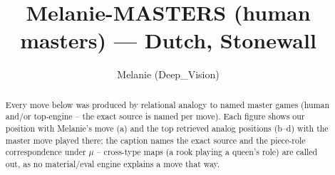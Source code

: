 \documentclass[11pt]{article}
\title{Melanie-MASTERS (human masters) — Dutch, Stonewall}
\author{Melanie (Deep\_Vision)}
\date{}
\begin{document}
\maketitle

\begin{abstract}Every move below was produced by relational analogy to named master games (human and/or top-engine -- the exact source is named per move). Each figure shows our position with Melanie's move (a) and the top retrieved analog positions (b--d) with the master move played there; the caption names the exact source and the piece-role correspondence under $\mu$ -- cross-type maps (a rook playing a queen's role) are called out, as no material/eval engine explains a move that way.\end{abstract}

\begin{figure}[p]\centering
\begin{subfigure}{0.46\textwidth}\centering
\resizebox{\linewidth}{!}{%
\newchessgame
\chessboard[
  setfen={rnbqk2r/pp4pp/2pbpn2/3p1p2/2PP4/5NP1/PP2PPBP/RNBQ1RK1 w kq - 0 7},
  showmover=false,
  pgfstyle=straightmove, color=movearrow, markmove={b2-b3}
]}
\caption{}
\end{subfigure}\hfill
\begin{subfigure}{0.46\textwidth}\centering
\resizebox{\linewidth}{!}{%
\newchessgame
\chessboard[
  setfen={rn1q1rk1/4ppbp/2pp1np1/1p6/p2PP3/2P2N1P/PPB2PP1/R1BQR1K1 b - - 2 12},
  showmover=false,
  pgfstyle=straightmove, color=movearrow, markmove={b8-d7}
]}
\caption{}
\end{subfigure}
\\[4pt]
\begin{subfigure}{0.46\textwidth}\centering
\resizebox{\linewidth}{!}{%
\newchessgame
\chessboard[
  setfen={rn1qk2r/pp3pp1/1bp1pn1p/3p4/1PPP4/5NP1/3BPPBP/1R1QR1K1 w kq - 1 13},
  showmover=false,
  pgfstyle=straightmove, color=movearrow, markmove={b4-b5}
]}
\caption{}
\end{subfigure}\hfill
\begin{subfigure}{0.46\textwidth}\centering
\resizebox{\linewidth}{!}{%
\newchessgame
\chessboard[
  setfen={r2qkb1r/1p3ppp/n1p2n2/3p1p2/2PP4/pPB1PN2/P4PPP/RN1Q1RK1 w kq - 0 11},
  showmover=false,
  pgfstyle=straightmove, color=movearrow, markmove={f3-e5}
]}
\caption{}
\end{subfigure}

\end{figure}
\end{document}
